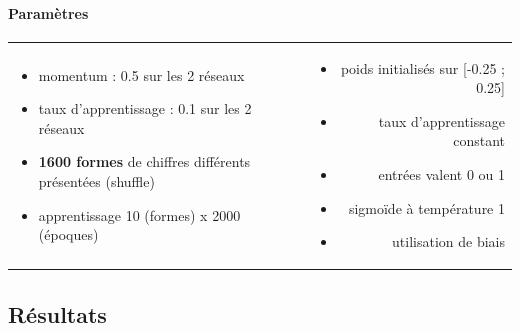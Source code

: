     \paragraph{Paramètres}
      \begin{center}
	\begin{tabular}{lr}
	  \begin{minipage}{230px}
	    \begin{itemize}
	      \item momentum : 0.5 sur les 2 réseaux
	      \item taux d'apprentissage : 0.1 sur les 2 réseaux
	      \item \textbf{1600 formes} de chiffres différents présentées (shuffle) \cite{Handwritten_256}
	      \item apprentissage 10 (formes) x 2000 (époques)
	    \end{itemize}
	  \end{minipage}
	  &
	  \begin{minipage}{230px}
	    \begin{itemize}
	      \item poids initialisés sur [-0.25 ; 0.25]
	      \item taux d'apprentissage constant
	      \item entrées valent 0 ou 1
	      \item sigmoïde à température 1
	      \item utilisation de biais
	    \end{itemize}
	  \end{minipage}
	\end{tabular}
      \end{center}

  
  \newpage
  \subsection{Résultats}
